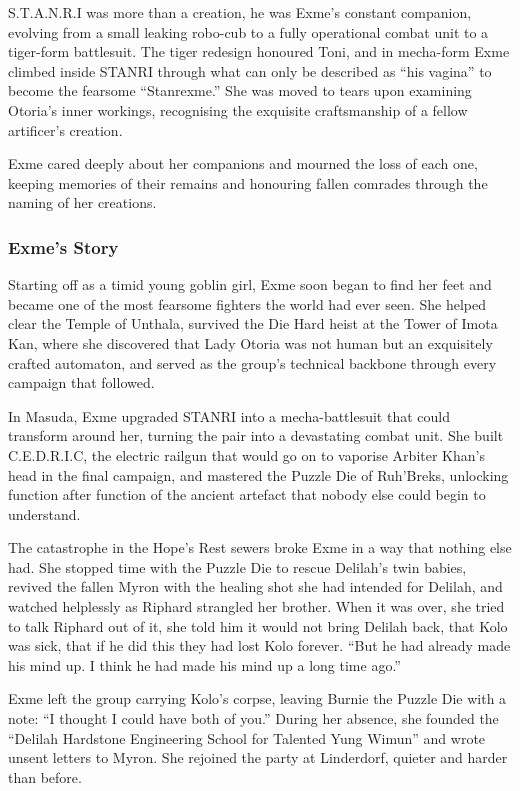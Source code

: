 S.T.A.N.R.I was more than a creation, he was Exme's constant companion, evolving from a small leaking robo-cub to a fully operational combat unit to a tiger-form battlesuit.  The tiger redesign honoured Toni, and in mecha-form Exme climbed inside STANRI through what can only be described as ``his vagina'' to become the fearsome ``Stanrexme.''  She was moved to tears upon examining Otoria's inner workings, recognising the exquisite craftsmanship of a fellow artificer's creation.

Exme cared deeply about her companions and mourned the loss of each one, keeping memories of their remains and honouring fallen comrades through the naming of her creations.  

\subsubsection{Exme's Story}

Starting off as a timid young goblin girl, Exme soon began to find her feet and became one of the most fearsome fighters the world had ever seen.  She helped clear the Temple of Unthala, survived the Die Hard heist at the Tower of Imota Kan, where she discovered that Lady Otoria was not human but an exquisitely crafted automaton, and served as the group's technical backbone through every campaign that followed.

In Masuda, Exme upgraded STANRI into a mecha-battlesuit that could transform around her, turning the pair into a devastating combat unit.  She built C.E.D.R.I.C, the electric railgun that would go on to vaporise Arbiter Khan's head in the final campaign, and mastered the Puzzle Die of Ruh'Breks, unlocking function after function of the ancient artefact that nobody else could begin to understand.

The catastrophe in the Hope's Rest sewers broke Exme in a way that nothing else had.  She stopped time with the Puzzle Die to rescue Delilah's twin babies, revived the fallen Myron with the healing shot she had intended for Delilah, and watched helplessly as Riphard strangled her brother.  When it was over, she tried to talk Riphard out of it, she told him it would not bring Delilah back, that Kolo was sick, that if he did this they had lost Kolo forever.  ``But he had already made his mind up.  I think he had made his mind up a long time ago.''

Exme left the group carrying Kolo's corpse, leaving Burnie the Puzzle Die with a note: ``I thought I could have both of you.''  During her absence, she founded the ``Delilah Hardstone Engineering School for Talented Yung Wimun'' and wrote unsent letters to Myron.  She rejoined the party at Linderdorf, quieter and harder than before.


